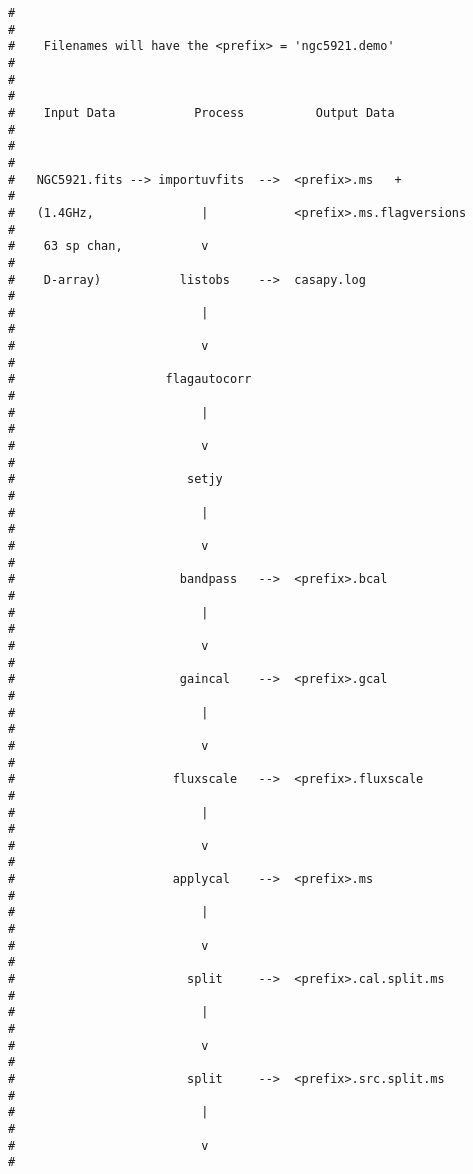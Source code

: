 \begin{verbatim}
#                                                                        #
#    Filenames will have the <prefix> = 'ngc5921.demo'                   #
#                                                                        #
#    Input Data           Process          Output Data                   #
#                                                                        #
#   NGC5921.fits --> importuvfits  -->  <prefix>.ms   +                  #
#   (1.4GHz,               |            <prefix>.ms.flagversions         #
#    63 sp chan,           v                                             #
#    D-array)           listobs    -->  casapy.log                       #
#                          |                                             #
#                          v                                             #
#                     flagautocorr                                       #
#                          |                                             #
#                          v                                             #
#                        setjy                                           #
#                          |                                             #
#                          v                                             #
#                       bandpass   -->  <prefix>.bcal                    #
#                          |                                             #
#                          v                                             #
#                       gaincal    -->  <prefix>.gcal                    #
#                          |                                             #
#                          v                                             #
#                      fluxscale   -->  <prefix>.fluxscale               #
#                          |                                             #
#                          v                                             #
#                      applycal    -->  <prefix>.ms                      #
#                          |                                             #
#                          v                                             #
#                        split     -->  <prefix>.cal.split.ms            #
#                          |                                             #
#                          v                                             #
#                        split     -->  <prefix>.src.split.ms            #
#                          |                                             #
#                          v                                             #

\end{verbatim}
